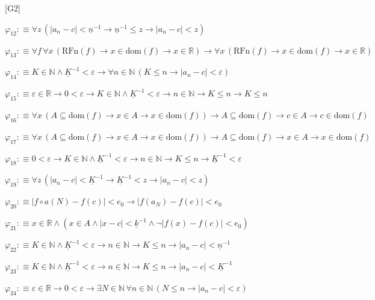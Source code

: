 \begin{fullproof}{[G2]}
\begin{abbrevlist}
\item $\varphi_{12} :\equiv \forall z\,(\lvert a_{n} - c \rvert < \underline{n}^{-1} \to \underline{n}^{-1} \leq z \to \lvert a_{n} - c \rvert < z)$
\item $\varphi_{13} :\equiv \forall f\,\forall x\,(\mathrm{RFn}(f) \to x \in \mathrm{dom}(f) \to x \in \mathbb{R}) \to \forall x\,(\mathrm{RFn}(f) \to x \in \mathrm{dom}(f) \to x \in \mathbb{R})$
\item $\varphi_{14} :\equiv K \in \mathbb{N} \land \underline{K}^{-1} < \varepsilon \to \forall n \in \mathbb{N}\,(K \leq n \to \lvert a_{n} - c \rvert < \varepsilon)$
\item $\varphi_{15} :\equiv \varepsilon \in \mathbb{R} \to 0 < \varepsilon \to K \in \mathbb{N} \land \underline{K}^{-1} < \varepsilon \to n \in \mathbb{N} \to K \leq n \to K \leq n$
\item $\varphi_{16} :\equiv \forall x\,(A \subseteq \mathrm{dom}(f) \to x \in A \to x \in \mathrm{dom}(f)) \to A \subseteq \mathrm{dom}(f) \to c \in A \to c \in \mathrm{dom}(f)$
\item $\varphi_{17} :\equiv \forall x\,(A \subseteq \mathrm{dom}(f) \to x \in A \to x \in \mathrm{dom}(f)) \to A \subseteq \mathrm{dom}(f) \to x \in A \to x \in \mathrm{dom}(f)$
\item $\varphi_{18} :\equiv 0 < \varepsilon \to K \in \mathbb{N} \land \underline{K}^{-1} < \varepsilon \to n \in \mathbb{N} \to K \leq n \to \underline{K}^{-1} < \varepsilon$
\item $\varphi_{19} :\equiv \forall z\,(\lvert a_{n} - c \rvert < \underline{K}^{-1} \to \underline{K}^{-1} < z \to \lvert a_{n} - c \rvert < z)$
\item $\varphi_{20} :\equiv \lvert f \circ a(N) - f(c) \rvert < e_{0} \to \lvert f(a_{N}) - f(c) \rvert < e_{0}$
\item $\varphi_{21} :\equiv x \in \mathbb{R} \land (x \in A \land \lvert x - c \rvert < \underline{k}^{-1} \land \neg \lvert f(x) - f(c) \rvert < e_{0})$
\item $\varphi_{22} :\equiv K \in \mathbb{N} \land \underline{K}^{-1} < \varepsilon \to n \in \mathbb{N} \to K \leq n \to \lvert a_{n} - c \rvert < \underline{n}^{-1}$
\item $\varphi_{23} :\equiv K \in \mathbb{N} \land \underline{K}^{-1} < \varepsilon \to n \in \mathbb{N} \to K \leq n \to \lvert a_{n} - c \rvert < \underline{K}^{-1}$
\item $\varphi_{24} :\equiv \varepsilon \in \mathbb{R} \to 0 < \varepsilon \to \exists N \in \mathbb{N}\,\forall n \in \mathbb{N}\,(N \leq n \to \lvert a_{n} - c \rvert < \varepsilon)$

\end{abbrevlist}
\end{fullproof}
